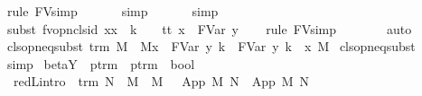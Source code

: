 \begin{isabellebody}
\ {\isacharparenleft}rule\ FV{\isacharunderscore}simp{}{\isacharparenright}\isanewline
\ \ \isamarkupfalse%
\ {}\ \isamarkupfalse%
\ simp\isanewline
\ \ \isamarkupfalse%
\ {}\ \isamarkupfalse%
\ simp\isanewline
\ \ \isamarkupfalse%
\ {\isacharparenleft}subst\ fv{\isacharunderscore}opn{\isacharunderscore}cls{\isacharunderscore}id{}{\isacharbrackleft}\ x{\isacharequal}x{\isacharprime}\ \ k\ {\isacharequal}\ {}\ \ t{\isacharequal}{\isachardoublequoteopen}t\ {\isacharbrackleft}x\ {\isacharcolon}{\isacharcolon}{\isacharequal}\ FVar\ y{\isacharbrackright}{\isachardoublequoteclose}{\isacharbrackright}{\isacharparenright}\isanewline
\ \ \isamarkupfalse%
\ {\isacharparenleft}rule\ FV{\isacharunderscore}simp{}{\isacharparenright}\isanewline
\ \ \isamarkupfalse%
\ {}\ {}\ \isamarkupfalse%
\ auto\isanewline
{}\isamarkupfalse%
%
\endisatagproof
{\isafoldproof}%
%
\isadelimproof
\isanewline
%
\endisadelimproof
\isanewline
{}\isamarkupfalse%
\ cls{\isacharunderscore}opn{\isacharunderscore}eq{\isacharunderscore}subst{}{\isacharcolon}\ {\isachardoublequoteopen}trm\ M\ {\isasymLongrightarrow}\ {\isacharparenleft}M{\isacharbrackleft}x\ {\isacharcolon}{\isacharcolon}{\isacharequal}\ FVar\ y{\isacharbrackright}{\isacharparenright}\ {\isacharequal}{\isacharparenleft}{\isacharbraceleft}k\ {\isasymrightarrow}\ FVar\ y{\isacharbraceright}\ {\isacharbraceleft}k\ {\isacharless}{\isacharminus}\ x{\isacharbraceright}\ M{\isacharparenright}{\isachardoublequoteclose}\isanewline
%
\isadelimproof
%
\endisadelimproof
%
\isatagproof
{}\isamarkupfalse%
\ cls{\isacharunderscore}opn{\isacharunderscore}eq{\isacharunderscore}subst\ \isamarkupfalse%
\ simp%
\endisatagproof
{\isafoldproof}%
%
\isadelimproof
%
\endisadelimproof
%
\isamarkuptrue%
\isamarkupfalse%
\ beta{\isacharunderscore}Y\ {\isacharcolon}{\isacharcolon}\ {\isachardoublequoteopen}ptrm\ {\isasymRightarrow}\ ptrm\ {\isasymRightarrow}\ bool{\isachardoublequoteclose}\ {\isacharparenleft}\ {\isachardoublequoteopen}{\isasymRightarrow}{\isachardoublequoteclose}\ {}{}{}{\isacharparenright}\isanewline
{}\isanewline
\ \ red{\isacharunderscore}L{\isacharbrackleft}intro{\isacharbrackright}{\isacharcolon}\ {\isachardoublequoteopen}{\isasymlbrakk}\ trm\ N\ {\isacharsemicolon}\ M\ {\isasymRightarrow}\ M{\isacharprime}\ {\isasymrbrakk}\ {\isasymLongrightarrow}\ App\ M\ N\ {\isasymRightarrow}\ App\ M{\isacharprime}\ N{\isachardoublequoteclose}\isanewline

\end{isabellebody}
